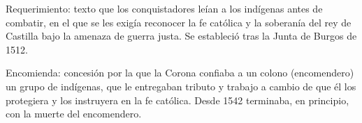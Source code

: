 \documentclass{book}
\begin{document}
\begin{tcolorbox}[title={Definición}, studiumdef, breakable]

Requerimiento: texto que los conquistadores leían a los indígenas antes de combatir, en el que se les exigía reconocer la fe católica y la soberanía del rey de Castilla bajo la amenaza de guerra justa. Se estableció tras la Junta de Burgos de 1512.

\end{tcolorbox}

\begin{tcolorbox}[title={Definición}, studiumdef, breakable]

Encomienda: concesión por la que la Corona confiaba a un colono (encomendero) un grupo de indígenas, que le entregaban tributo y trabajo a cambio de que él los protegiera y los instruyera en la fe católica. Desde 1542 terminaba, en principio, con la muerte del encomendero.

\end{tcolorbox}
\end{document}
